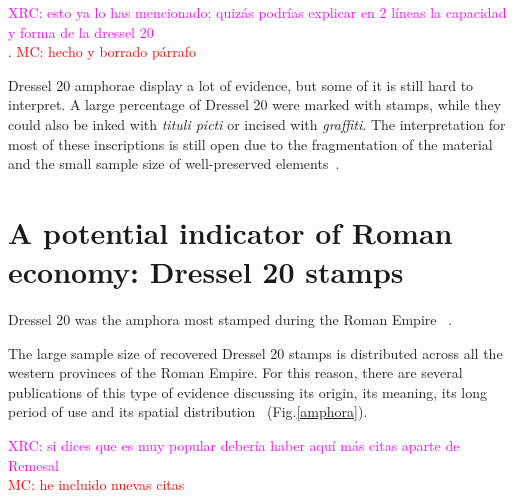 \documentclass[review]{elsarticle}
\newcommand{\memo}[2]{\textcolor{#1}{#2}}
\newcommand{\maria}[1]{\memo{red}{MC: #1\\}}
\newcommand{\xavi}[1]{\memo{magenta}{XRC: #1\\}}
\begin{document}
 
\xavi{esto ya lo has mencionado; quizás podrías explicar en 2 líneas la capacidad y forma de la dressel 20}.
\maria{hecho y borrado párrafo} 

Dressel 20 amphorae display a lot of evidence, but some of it is still hard to interpret. A large percentage of Dressel 20 were marked with stamps, while they could also be inked with \textit{tituli picti} or incised with \textit{graffiti}. The interpretation for most of these inscriptions is still open due to the fragmentation of the material and the small sample size of well-preserved elements~\citep{aguilera_evolucion_2007,rovira_guardiola_grafitos_2007}. 

 

\section{A potential indicator of Roman economy: Dressel 20 stamps}

Dressel 20 was the amphora most stamped during the Roman Empire ~\citep[18]{millet_anforas_1998}. 




The large sample size of recovered Dressel 20 stamps is distributed across all the western provinces of the Roman Empire. For this reason, there are several publications of this type of evidence discussing its origin, its meaning, its long period of use and its spatial distribution~\citep{dressel_ricerche_1878,
rodriguez_economioleicola_1977,
chicepi1985,millet_anforas_1998, remesal_sellar_2016} (Fig.\ref{amphora}).

\xavi{si dices que es muy popular debería haber aquí más citas aparte de Remesal}
\maria{he incluido nuevas citas} 
\end{document}
